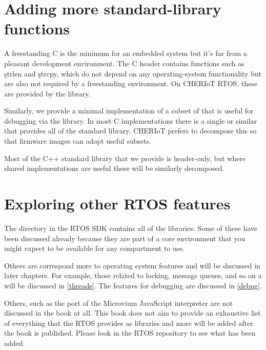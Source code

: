 \section{Adding more standard-library functions}

A freestanding C is the minimum for an embedded system but it's far from a pleasant development environment.
The C  header contains functions such as \c{strlen} and \c{strcpy}, which do not depend on any operating-system functionality but are also not required by a freestanding environment.
On CHERIoT RTOS, these are provided by the  library.

Similarly, we provide a minimal implementation of a subset of  that is useful for debugging via the  library.
In most C implementations there is a single  or similar that provides all of the standard library.
CHERIoT prefers to decompose this so that firmware images can adopt useful subsets.

Most of the C++ standard library that we provide is header-only, but where shared implementations are useful these will be similarly decomposed.

\section{Exploring other RTOS features}

The  directory in the RTOS SDK contains all of the libraries.
Some of these have been discussed already because they are part of a core environment that you might expect to be available for any compartment to use.

Others are correspond more to operating system features and will be discussed in later chapters.
For example, those related to locking, message queues, and so on a will be discussed in \ref{threads}.
The features for debugging are discussed in \ref{debug}.

Others, such as the port of the Microvium JavaScript interpreter are not discussed in the book at all.
This book does not aim to provide an exhaustive list of everything that the RTOS provides as libraries and more will be added after the book is published.
Please look in the RTOS repository to see what has been added.
